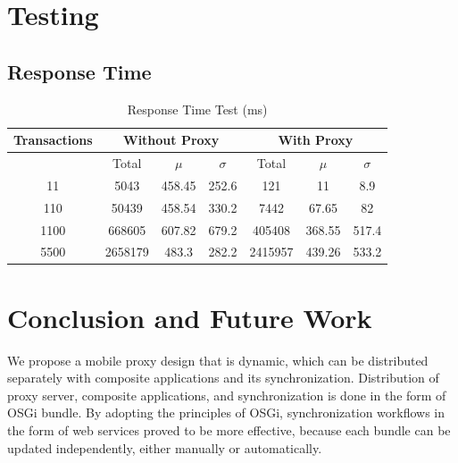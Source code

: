 \documentclass[conference]{IEEEtran}
\begin{document}




\section{Testing}
\subsection{Response Time}
\begin{table}
\renewcommand{\arraystretch}{1.3}
\caption{Response Time Test (ms)}
\label{tbl:response_time}
\centering
\begin{tabular}{|c||c|c|c|c|c|c|}
\hline
Transactions & \multicolumn{3}{c|}{Without Proxy} & \multicolumn{3}{c|}{With Proxy}\\
\hline
& Total & $\mu$ & $\sigma$ & Total & $\mu$ & $\sigma$\\
\hline
11 & 5043 & 458.45 & 252.6 & 121 & 11 & 8.9\\
\hline
110 & 50439 & 458.54 & 330.2 & 7442 & 67.65 & 82\\
\hline
1100 & 668605 & 607.82 & 679.2 & 405408 & 368.55 & 517.4\\
\hline
5500 & 2658179 & 483.3 & 282.2 & 2415957 & 439.26 & 533.2\\
\hline
\end{tabular}
\end{table}




\section{Conclusion and Future Work}
We propose a mobile proxy design that is dynamic, which can be distributed separately with composite applications and its synchronization. Distribution of proxy server, composite applications, and synchronization is done in the form of OSGi bundle. By adopting the principles of OSGi, synchronization workflows in the form of web services proved to be more effective, because each bundle can be updated independently, either manually or automatically.
\end{document}
